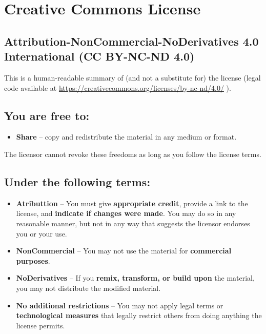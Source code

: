 \chapter*{Creative Commons License}

\section*{Attribution-NonCommercial-NoDerivatives 4.0 International (CC BY-NC-ND 4.0)}

\noindent This is a human-readable summary of (and not a substitute for) the license
(legal code available at
\url{https://creativecommons.org/licenses/by-nc-nd/4.0/}
).

\section*{You are free to:}

\begin{itemize}

\item \textbf{Share} --
copy and redistribute the material in any medium or format.

\end{itemize}

The licensor cannot revoke these freedoms as long as you follow the license terms.

\section*{Under the following terms:}

\begin{itemize}

\item \ccAttribution \quad \textbf{Atributtion} --
You must give \textbf{appropriate credit}, provide a link to the license, 
and \textbf{indicate if changes were made}. 
You may do so in any reasonable manner, but not in any
way that suggests the licensor endorses you or your use.

\item \ccNonCommercialEU \quad \textbf{NonCommercial} --
You may not use the material for \textbf{commercial purposes}.

\item \ccNoDerivatives \quad \textbf{NoDerivatives} --
If you \textbf{remix, transform, or build upon}
the material, you may not distribute the modified material. 

\item \textbf{No additional restrictions} --
You may not apply legal terms or \textbf{technological measures} 
that legally restrict others from doing anything the license permits. 

\end{itemize}

